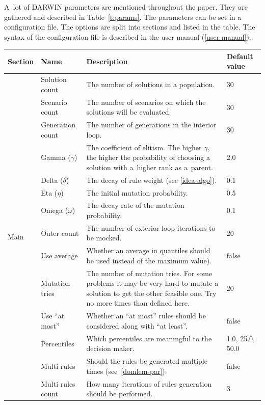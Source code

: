 A~lot of DARWIN parameters are mentioned throughout the paper. They are
gathered and described in Table~\ref{t:params}. The parameters can be set in a
configuration file. The options are split into sections and listed in the
table. The syntax of the configuration file is described in the user manual
(\ref{user-manual}).

\begin{table}
  \centering
  \begin{tabular}{l l p{7cm} l}
    \hline
    Section &  Name & Description & Default value \\
    \hline
    \hline
    \multirow{15}{*}{Main} & 
    Solution count & The number of solutions in a population. & 30 \\
    & Scenario count & The number of scenarios on which the solutions will be evaluated.  & 30 \\
    & Generation count & The number of generations in the interior loop. & 30 \\
    & Gamma ($\gamma$) & The coefficient of elitism. The higher $\gamma$, the
    higher the probability of choosing a solution with a~higher rank as
    a~parent. & 2.0  \\
    & Delta ($\delta$) & The decay of rule weight (see \ref{idea-algo}). & 0.1  \\
    & Eta ($\eta$) & The initial mutation probability.  & 0.5    \\
    & Omega ($\omega$)& The decay rate of the mutation probability. & 0.1  \\
    & Outer count & The number of exterior loop iterations to be mocked. & 20 \\
    & Use average & Whether an average in quantiles should be used instead of
    the maximum value). & false  \\
    & Mutation tries & The number of mutation tries. For some problems it may be
    very hard to mutate a solution to get the other feasible one. Try no more
    times than defined here.  & 20  \\
    & Use ``at most'' & Whether an ``at most'' rules should be considered
    along with ``at least''. & false \\
    & Percentiles & Which percentiles are meaningful to the decision maker. & 1.0, 25.0, 50.0  \\
    & Multi rules & Should the rules be generated multiple times (see~\ref{domlem-par}). & false \\
    & Multi rules count & How many iterations of rules generation should be performed. & 3 \\

\end{tabular}
\end{table}
